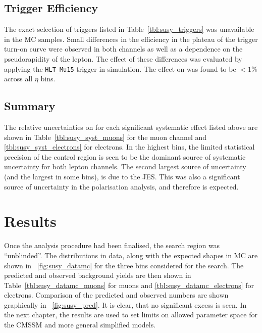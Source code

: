 \subsection{Trigger Efficiency}
The exact selection of triggers listed in Table~\ref{tbl:susy_triggers} was
unavailable in the \ac{MC} samples. Small differences in the efficiency in
the plateau of the trigger turn-on curve were observed in both channels as well
as a dependence on the pseudorapidity of the lepton. The effect of these
differences was evaluated by applying the \texttt{HLT\_Mu15} trigger in
simulation. The effect on \RCS was found to be $<1\%$ across all $\eta$ bins.


\subsection{Summary}
The relative uncertainties on \RCS for each significant systematic effect listed
above are shown in Table~\ref{tbl:susy_syst_muons} for the muon channel and
\ref{tbl:susy_syst_electrons} for electrons. In the highest \STlep bins, the
limited statistical precision of the control region is seen to be the dominant
source of systematic uncertainty for both lepton channels. The second largest
source of uncertainty (and the largest in some bins), is due to the
\ac{JES}. This was also a significant source of uncertainty in the \PW
polarisation analysis, and therefore is expected.




\section{Results}
Once the analysis procedure had been finalised, the search region was
``unblinded''. The \LP distributions in data, along with the expected shapes in
\ac{MC} are shown in \fig~\ref{fig:susy_datamc} for the three \STlep bins
considered for the search. The predicted and observed background yields are then
shown in Table~\ref{tbl:susy_datamc_muons} for muons and
\ref{tbl:susy_datamc_electrons} for electrons. Comparison of the predicted and
observed numbers are shown graphically in \fig~\ref{fig:susy_pred}. It is
clear, that no significant excess is seen. In the next chapter, the results are
used to set limits on allowed parameter space for the \ac{CMSSM} and more
general simplified models.

